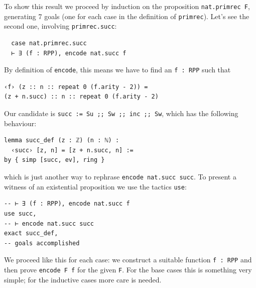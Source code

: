 \documentclass[oneside]{book}
\theoremstyle{definition}
\theoremstyle{remark}
\theoremstyle{plain}
\begin{document}
To show this result we proceed by induction on the proposition \lstinline{nat.primrec F},
generating 7 goals (one for each case in the definition of \lstinline{primrec}).
Let's see the second one, involving \lstinline{primrec.succ}:
\begin{lstlisting}
  case nat.primrec.succ
  ⊢ ∃ (f : RPP), encode nat.succ f
\end{lstlisting}
By definition of \lstinline{encode},
this means we have to find an \lstinline{f : RPP} such that
\begin{lstlisting}
‹f› (z :: n :: repeat 0 (f.arity - 2)) =
(z + n.succ) :: n :: repeat 0 (f.arity - 2)
\end{lstlisting}
Our candidate is \lstinline{succ := Su ;; Sw ;; inc ;; Sw}, which has the following behaviour:
\begin{lstlisting}
lemma succ_def (z : ℤ) (n : ℕ) :
  ‹succ› [z, n] = [z + n.succ, n] :=
by { simp [succ, ev], ring }
\end{lstlisting}
which is just another way to rephrase \lstinline{encode nat.succ succ}.
To present a witness of an existential proposition we use the tactics \lstinline{use}:
\begin{lstlisting}
-- ⊢ ∃ (f : RPP), encode nat.succ f
use succ,
-- ⊢ encode nat.succ succ
exact succ_def,
-- goals accomplished
\end{lstlisting}

We proceed like this for each case:
we construct a suitable function \lstinline{f : RPP}
and then prove \lstinline{encode F f} for the given \lstinline{F}.
For the base cases this is something very simple; for the inductive cases more care is needed.
\end{document}
